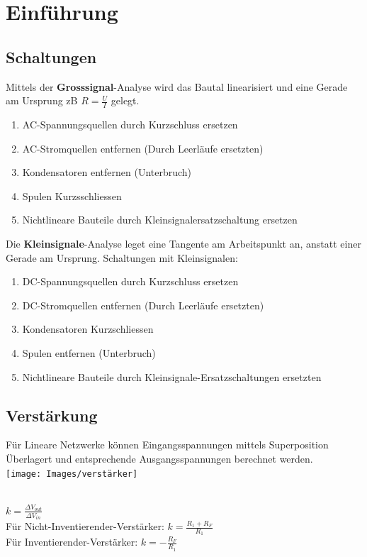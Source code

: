 \section{Einführung}
\subsection{Schaltungen}
Mittels der \textbf{Grosssignal}-Analyse wird das Bautal linearisiert und eine Gerade am Ursprung zB $R = \frac{U}{I}$ gelegt.
\begin{enumerate}[nosep]
	\item AC-Spannungsquellen durch Kurzschluss ersetzen
	\item AC-Stromquellen entfernen (Durch Leerläufe ersetzten)
	\item Kondensatoren entfernen (Unterbruch)
	\item Spulen Kurzsschliessen
	\item Nichtlineare Bauteile durch Kleinsignalersatzschaltung ersetzen
\end{enumerate}


Die \textbf{Kleinsignale}-Analyse leget eine Tangente am Arbeitspunkt an, anstatt einer Gerade am Ursprung. Schaltungen mit Kleinsignalen:
\begin{enumerate}[nosep]
	\item DC-Spannungsquellen durch Kurzschluss ersetzen
	\item DC-Stromquellen entfernen (Durch Leerläufe ersetzten)
	\item Kondensatoren Kurzschliessen
	\item Spulen entfernen (Unterbruch)
	\item Nichtlineare Bauteile durch Kleinsignale-Ersatzschaltungen ersetzten
\end{enumerate}

\subsection{Verstärkung}
Für Lineare Netzwerke können Eingangsspannungen mittels Superposition Überlagert und entsprechende Ausgangsspannungen berechnet werden.\\
\texttt{[image: Images/verstärker]}

~\\
$k = \frac{\Delta V_{out}}{\Delta V_{in}}$\\
Für Nicht-Inventierender-Verstärker: $k = \frac{R_1 + R_F}{R_1}$ \\
Für Inventierender-Verstärker: $k = -\frac{R_F}{R_1}$


